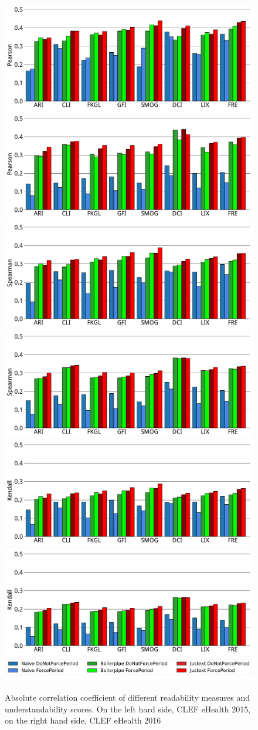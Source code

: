 \begin{figure}[th!]
   \centering
   \includegraphics[width=.45\textwidth]{graphics/bar_corr_pearson15_values}
   \includegraphics[width=.45\textwidth]{graphics/bar_corr_pearson16_values}
   \includegraphics[width=.45\textwidth]{graphics/bar_corr_spearman15_values}
   \includegraphics[width=.45\textwidth]{graphics/bar_corr_spearman16_values}
   \includegraphics[width=.45\textwidth]{graphics/bar_corr_kendalltau15_values}
   \includegraphics[width=.45\textwidth]{graphics/bar_corr_kendalltau16_values}
   \includegraphics[width=.8\textwidth]{graphics/legend62}
    \caption{Absolute correlation coefficient of different readability measures and understandability scores. On the left hard side, CLEF eHealth 2015, on the right hand side, CLEF eHealth 2016}
   \label{fig:bar_corr_clef15}
\end{figure}



